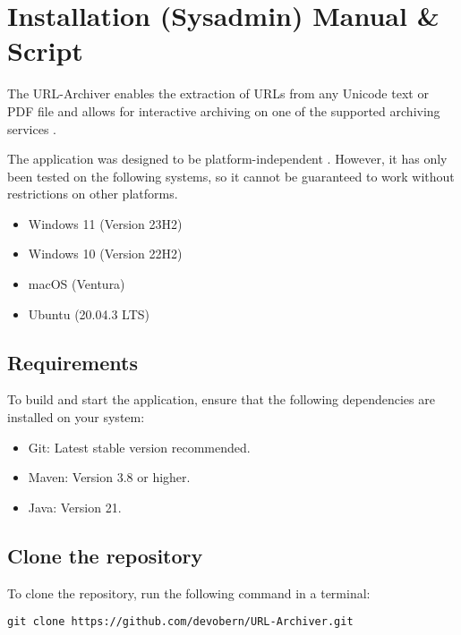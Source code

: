 
\section{Installation (Sysadmin) Manual \& Script} \label{sec::installation_manual}
The URL-Archiver enables the extraction of URLs from any Unicode text or PDF file and allows for interactive archiving
on one of the supported archiving services .
\begin{bfhWarnBox}
The application was designed to be platform-independent . However, it has only been tested on the following systems, so it cannot be guaranteed to work without restrictions on other platforms.
\begin{itemize}
	\item Windows 11 (Version 23H2)
	\item Windows 10 (Version 22H2)
	\item macOS (Ventura)
	\item Ubuntu (20.04.3 LTS)
\end{itemize}
\end{bfhWarnBox}

\subsection{Requirements}

To build and start the application, ensure that the following dependencies are installed on your system:
\begin{itemize}
	\item Git: Latest stable version recommended.
	\item Maven: Version 3.8 or higher.
	\item Java: Version 21.
\end{itemize}

\subsection{Clone the repository}

To clone the repository, run the following command in a terminal:

\begin{lstlisting}[numbers=none, caption={Command to Clone the Repository for URL-Archiver}, label={lst:git_clone}]
git clone https://github.com/devobern/URL-Archiver.git
\end{lstlisting}

